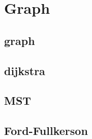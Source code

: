 \section{Graph}

\subsection{graph}


\subsection{dijkstra}


\subsection{MST}


\subsection{Ford-Fullkerson}

